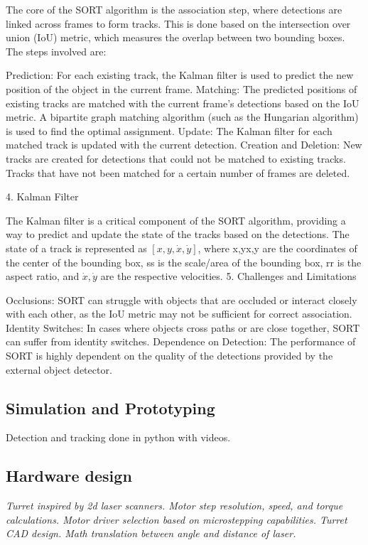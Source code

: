 The core of the SORT algorithm is the association step, where detections are linked across frames to form tracks. This is done based on the intersection over union (IoU) metric, which measures the overlap between two bounding boxes. The steps involved are:

Prediction: For each existing track, the Kalman filter is used to predict the new position of the object in the current frame.
Matching: The predicted positions of existing tracks are matched with the current frame's detections based on the IoU metric. A bipartite graph matching algorithm (such as the Hungarian algorithm) is used to find the optimal assignment.
Update: The Kalman filter for each matched track is updated with the current detection.
Creation and Deletion: New tracks are created for detections that could not be matched to existing tracks. Tracks that have not been matched for a certain number of frames are deleted.

4. Kalman Filter

The Kalman filter is a critical component of the SORT algorithm, providing a way to predict and update the state of the tracks based on the detections. The state of a track is represented as $[x,y,\dot{x},\dot{y}]$, where x,yx,y are the coordinates of the center of the bounding box, ss is the scale/area of the bounding box, rr is the aspect ratio, and $\dot{x},\dot{y}$ are the respective velocities.
5. Challenges and Limitations

Occlusions: SORT can struggle with objects that are occluded or interact closely with each other, as the IoU metric may not be sufficient for correct association.
Identity Switches: In cases where objects cross paths or are close together, SORT can suffer from identity switches.
Dependence on Detection: The performance of SORT is highly dependent on the quality of the detections provided by the external object detector.

\subsection{Simulation and Prototyping}
Detection and tracking done in python with videos.


\subsection{Hardware design}
\textit{Turret inspired by 2d laser scanners. Motor step resolution, speed, and torque calculations. Motor driver selection based on microstepping capabilities. Turret CAD design. Math translation between angle and distance of laser.}

